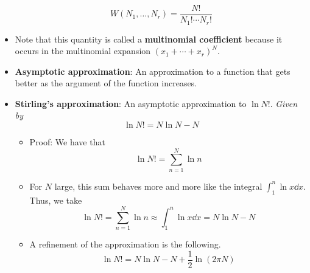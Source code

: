 \documentclass[../notes.tex]{subfiles}
\begin{document}
\begin{itemize}
\begin{equation*}
        W(N_1,\dots,N_r) = \frac{N!}{N_1!\cdots N_r!}
    \end{equation*}
    \item Note that this quantity is called a \textbf{multinomial coefficient} because it occurs in the multinomial expansion $(x_1+\cdots+x_r)^N$.
    \item \textbf{Asymptotic approximation}: An approximation to a function that gets better as the argument of the function increases.
    \item \textbf{Stirling's approximation}: An asymptotic approximation to $\ln N!$. \emph{Given by}
    \begin{equation*}
        \ln N! = N\ln N-N
    \end{equation*}
    \begin{itemize}
        \item Proof: We have that
        \begin{equation*}
            \ln N! = \sum_{n=1}^N\ln n
        \end{equation*}
        \item For $N$ large, this sum behaves more and more like the integral $\int_1^n\ln x\dd{x}$. Thus, we take
        \begin{equation*}
            \ln N! = \sum_{n=1}^N\ln n
            \approx \int_1^n\ln x\dd{x}
            = N\ln N-N
        \end{equation*}
        \item A refinement of the approximation is the following.
        \begin{equation*}
            \ln N! = N\ln N-N+\frac{1}{2}\ln(2\pi N)
        \end{equation*}
    \end{itemize}
\end{itemize}
\end{document}
